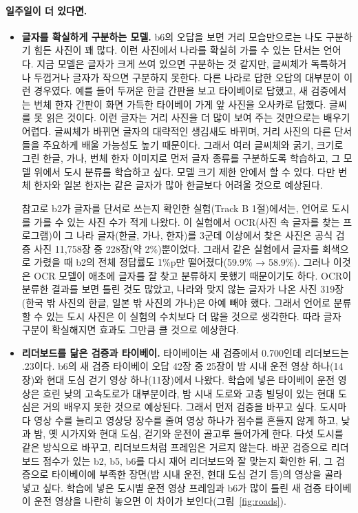 \documentclass[11pt]{article}
\begin{document}
\paragraph{일주일이 더 있다면.}
\begin{itemize}
\item \textbf{글자를 확실하게 구분하는 모델.} b6의 오답을 보면 거리 모습만으로는 나도 구분하기 힘든 사진이 꽤 많다. 이런 사진에서 나라를 확실히 가를 수 있는 단서는 언어다. 지금 모델은 글자가 크게 쓰여 있으면 구분하는 것 같지만, 글씨체가 독특하거나 두껍거나 글자가 작으면 구분하지 못한다. 다른 나라로 답한 오답의 대부분이 이런 경우였다. 예를 들어 두꺼운 한글 간판을 보고 타이베이로 답했고, 새 검증에서는 번체 한자 간판이 화면 가득한 타이베이 가게 앞 사진을 오사카로 답했다. 글씨를 못 읽은 것이다. 이런 글자는 거리 사진을 더 많이 보여 주는 것만으로는 배우기 어렵다. 글씨체가 바뀌면 글자의 대략적인 생김새도 바뀌며, 거리 사진의 다른 단서들을 주요하게 배울 가능성도 높기 때문이다. 그래서 여러 글씨체와 굵기, 크기로 그린 한글, 가나, 번체 한자 이미지로 먼저 글자 종류를 구분하도록 학습하고, 그 모델 위에서 도시 분류를 학습하고 싶다. 모델 크기 제한 안에서 할 수 있다. 다만 번체 한자와 일본 한자는 같은 글자가 많아 한글보다 어려울 것으로 예상된다.

참고로 b2가 글자를 단서로 쓰는지 확인한 실험(Track B 1절)에서는, 언어로 도시를 가를 수 있는 사진 수가 적게 나왔다. 이 실험에서 OCR(사진 속 글자를 찾는 프로그램)이 그 나라 글자(한글, 가나, 한자)를 3군데 이상에서 찾은 사진은 공식 검증 사진 11,758장 중 228장(약 2\%)뿐이었다. 그래서 같은 실험에서 글자를 회색으로 가렸을 때 b2의 전체 정답률도 1\%p만 떨어졌다(59.9\% → 58.9\%). 그러나 이것은 OCR 모델이 애초에 글자를 잘 찾고 분류하지 못했기 때문이기도 하다. OCR이 분류한 결과를 보면 틀린 것도 많았고, 나라와 맞지 않는 글자가 나온 사진 319장(한국 밖 사진의 한글, 일본 밖 사진의 가나)은 아예 빼야 했다. 그래서 언어로 분류할 수 있는 도시 사진은 이 실험의 수치보다 더 많을 것으로 생각한다. 따라 글자 구분이 확실해지면 효과도 그만큼 클 것으로 예상한다.
\item \textbf{리더보드를 닮은 검증과 타이베이.} 타이베이는 새 검증에서 0.700인데 리더보드는 .23이다. b6의 새 검증 타이베이 오답 42장 중 25장이 밤 시내 운전 영상 하나(14장)와 현대 도심 걷기 영상 하나(11장)에서 나왔다. 학습에 넣은 타이베이 운전 영상은 흐린 낮의 고속도로가 대부분이라, 밤 시내 도로와 고층 빌딩이 있는 현대 도심은 거의 배우지 못한 것으로 예상된다. 그래서 먼저 검증을 바꾸고 싶다. 도시마다 영상 수를 늘리고 영상당 장수를 줄여 영상 하나가 점수를 흔들지 않게 하고, 낮과 밤, 옛 시가지와 현대 도심, 걷기와 운전이 골고루 들어가게 한다. 다섯 도시를 같은 방식으로 바꾸고, 리더보드처럼 프레임은 거르지 않는다. 바꾼 검증으로 리더보드 점수가 있는 b2, b5, b6를 다시 재어 리더보드와 잘 맞는지 확인한 뒤, 그 검증으로 타이베이에 부족한 장면(밤 시내 운전, 현대 도심 걷기 등)의 영상을 골라 넣고 싶다. 학습에 넣은 도시별 운전 영상 프레임과 b6가 많이 틀린 새 검증 타이베이 운전 영상을 나란히 놓으면 이 차이가 보인다(그림~\ref{fig:roads}).
\end{itemize}
\end{document}
